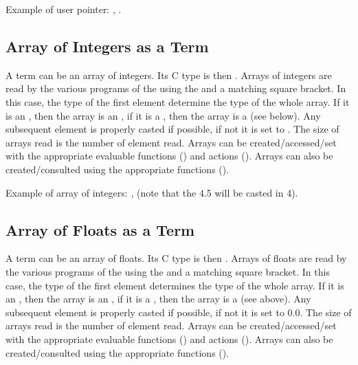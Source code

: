 Example of user pointer: , .

\subsection{Array of Integers as a Term}

A term can be an array of integers. Its C type is then . Arrays
of integers are read by the various programs of the \COPRSDE{} using the
\samp{[} and a matching \samp{]} square bracket. In this case, the type of the
first element determine the type of the whole array. If it is an
, then the array is an , if it is a ,
then the array is a  (see below).  Any subsequent element is
properly casted if possible, if not it is set to . The size of arrays
read is the number of element read. Arrays can be created/accessed/set with the
appropriate evaluable functions () and actions (). Arrays can also
be created/consulted using the appropriate functions ().

Example of array of integers: \code{[ 1 2 4 5 0 3 4]}, \code{[1 3 4.5 5 7]}
(note that the 4.5 will be casted in 4).

\subsection{Array of Floats as a Term}

A term can be an array of floats. Its C type is then . Arrays
of floats are read by the various programs of the \COPRSDE{} using the \samp{[}
and a matching \samp{]} square bracket. In this case, the type of the first
element determines the type of the whole array. If it is an , then
the array is an , if it is a , then the array is a
 (see above).  Any subsequent element is properly casted if
possible, if not it is set to 0.0.  The size of arrays read is the number of
element read. Arrays can be created/accessed/set with the appropriate evaluable
functions () and actions
(). Arrays can also be created/consulted
using the appropriate functions ().

